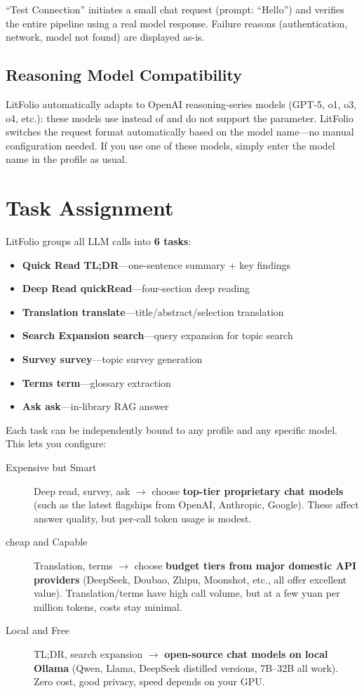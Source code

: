 ``Test Connection'' initiates a small chat request (prompt: ``Hello'') and verifies the
entire pipeline using a real model response. Failure reasons (authentication, network,
model not found) are displayed as-is.

\subsection{Reasoning Model Compatibility}

LitFolio automatically adapts to OpenAI reasoning-series models (GPT-5, o1, o3, o4, etc.):
these models use  instead of  and do not
support the  parameter. LitFolio switches the request format automatically
based on the model name---no manual configuration needed. If you use one of these models,
simply enter the model name in the profile as usual.

\section{Task Assignment}

LitFolio groups all LLM calls into \textbf{6 tasks}:

\begin{itemize}
  \item \textbf{Quick Read TL;DR}---one-sentence summary + key findings
  \item \textbf{Deep Read quickRead}---four-section deep reading
  \item \textbf{Translation translate}---title/abstract/selection translation
  \item \textbf{Search Expansion search}---query expansion for topic search
  \item \textbf{Survey survey}---topic survey generation
  \item \textbf{Terms term}---glossary extraction
  \item \textbf{Ask ask}---in-library RAG answer
\end{itemize}

Each task can be independently bound to any profile and any specific model. This lets
you configure:
\begin{description}
  \item[Expensive but Smart] Deep read, survey, ask \ensuremath{\rightarrow} choose
    \textbf{top-tier proprietary chat models} (such as the latest flagships from OpenAI,
    Anthropic, Google). These affect answer quality, but per-call token usage is modest.
  \item[cheap and Capable] Translation, terms \ensuremath{\rightarrow} choose
    \textbf{budget tiers from major domestic API providers} (DeepSeek, Doubao, Zhipu,
    Moonshot, etc., all offer excellent value). Translation/terms have high call volume,
    but at a few yuan per million tokens, costs stay minimal.
  \item[Local and Free] TL;DR, search expansion \ensuremath{\rightarrow} \textbf{open-source
    chat models on local Ollama} (Qwen, Llama, DeepSeek distilled versions, 7B--32B
    all work). Zero cost, good privacy, speed depends on your GPU.
\end{description}


